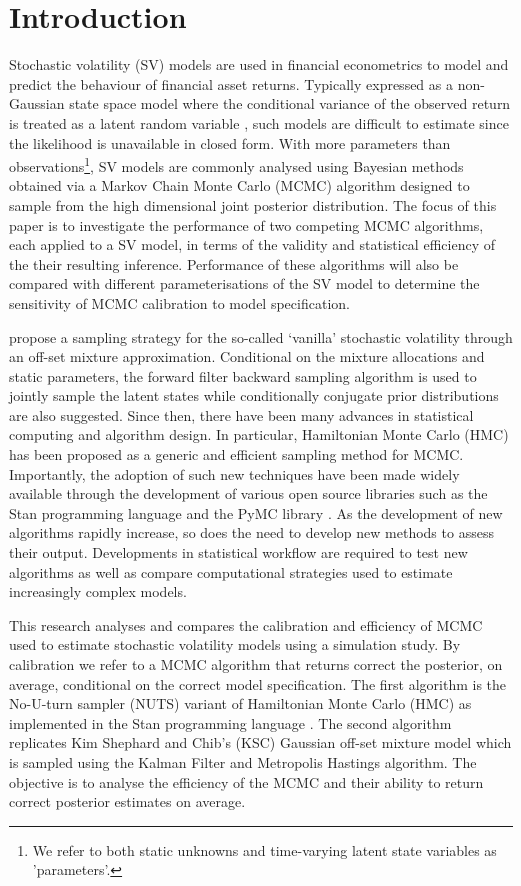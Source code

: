 \documentclass[12pt, a4paper]{article}
\begin{document}
\section{Introduction}
    Stochastic volatility (SV) models are used in financial econometrics to model and predict the behaviour of financial asset returns. Typically expressed as a non-Gaussian state space model where the conditional variance of the observed return is treated as a latent random variable \citep{hull1987pricing, chesney1989pricing}, such models are difficult to estimate since the likelihood is unavailable in closed form. With more parameters than observations\footnote{We refer to both static unknowns and time-varying latent state variables as 'parameters'.}, SV models are commonly analysed using Bayesian methods obtained via a Markov Chain Monte Carlo (MCMC) algorithm designed to sample from the high dimensional joint posterior distribution. The focus of this paper is to investigate the performance of two competing MCMC algorithms, each applied to a SV model, in terms of the validity and statistical efficiency of the their resulting inference. Performance of these algorithms will also be compared with different parameterisations of the SV model to determine the sensitivity of MCMC calibration to model specification.

    \citet{kim1998stochastic} propose a sampling strategy for the so-called `vanilla' stochastic volatility through an off-set mixture approximation. Conditional on the mixture allocations and static parameters, the forward filter backward sampling algorithm \citep{carter1994gibbs, fruhwirth1995bayesian} is used to jointly sample the latent states while conditionally  conjugate prior distributions are also suggested.  Since then, there have been many advances in statistical computing and algorithm design. In particular, Hamiltonian Monte Carlo (HMC) has been proposed as a generic and efficient sampling method for MCMC. Importantly, the adoption of such new techniques have been made widely available through the development of various open source libraries such as the Stan programming language \citep{stan} and the PyMC library \citep{pymc2023}. As the development of new algorithms rapidly increase, so does the need to develop new methods to assess their output. Developments in statistical workflow are required to test new algorithms as well as compare computational strategies used to estimate increasingly complex models.

    This research analyses and compares the calibration and efficiency of MCMC used to estimate stochastic volatility models using a simulation study. By calibration we refer to a MCMC algorithm that returns correct the posterior, on average, conditional on the correct model specification. The first algorithm is the No-U-turn sampler (NUTS) variant of Hamiltonian Monte Carlo (HMC) as implemented in the Stan programming language \citep{hoffman2014no, betancourt2017conceptual, stan}. The second algorithm replicates Kim Shephard and Chib's (KSC) Gaussian off-set mixture model which is sampled using the Kalman Filter and Metropolis Hastings algorithm. The objective is to analyse the efficiency of the MCMC and their ability to return correct posterior estimates on average.
\end{document}
